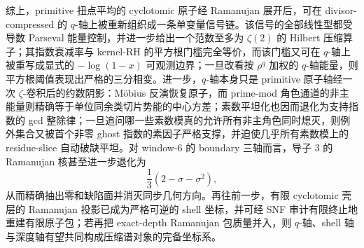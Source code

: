





综上，primitive 扭点平均的 cyclotomic 原子经 Ramanujan 展开后，可在 divisor-compressed 的 \(q\)-轴上被重新组织成一条单变量信号链。该信号的全部线性型都受导数 Parseval 能量控制，并进一步给出一个范数至多为 \(\zeta(2)\) 的 Hilbert 压缩算子；其指数衰减率与 kernel-RH 的平方根门槛完全等价，而该门槛又可在 \(q\)-轴上被重写成显式的 \(-\log(1-x)\) 可观测边界；一旦改看按 \(\rho^q\) 加权的 \(q\)-轴能量，则平方根阈值表现出严格的三分相变。进一步，\(q\)-轴本身只是 primitive 原子轴经一次 \(\zeta\)-卷积后的约数阴影：Möbius 反演恢复原子，而 prime-mod 角色通道的非主能量则精确等于单位同余类切片势能的中心方差；素数平坦化也因而退化为支持指数的 gcd 整除律；一旦追问哪一些素数模真的允许所有非主角色同时熄灭，则例外集合又被首个非零 ghost 指数的素因子严格支撑，并迫使几乎所有素数模上的 residue-slice 自动破缺平坦。对 window-\(6\) 的 boundary 三轴而言，导子 \(3\) 的 Ramanujan 核甚至进一步退化为
\[
\frac13(2-\sigma-\sigma^2),
\]
从而精确抽出零和缺陷面并消灭同步几何方向。再往前一步，有限 cyclotomic 壳层的 Ramanujan 投影已成为严格可逆的 shell 坐标，并可经 SNF 审计有限终止地重建有限原子包；若再把 exact-depth Ramanujan 包质量并入，则 \(q\)-轴、shell 轴与深度轴有望共同构成压缩谱对象的完备坐标系。

\endinput
